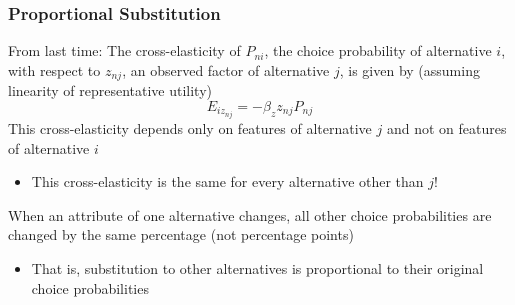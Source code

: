 \documentclass{beamer}
\begin{document}
\begin{frame}\frametitle{Proportional Substitution}
    From last time: The cross-elasticity of $P_{ni}$, the choice probability of alternative $i$, with respect to $z_{nj}$, an observed factor of alternative $j$, is given by (assuming linearity of representative utility)
    $$E_{iz_{nj}} = -\beta_z z_{nj} P_{nj}$$
    This cross-elasticity depends only on features of alternative $j$ and not on features of alternative $i$
    \begin{itemize}
    	\item This cross-elasticity is the same for every alternative other than $j$!
    \end{itemize}
    \vspace{2ex}
    When an attribute of one alternative changes, all other choice probabilities are changed by the same percentage (not percentage points)
    \begin{itemize}
    	\item That is, substitution to other alternatives is proportional to their original choice probabilities
    \end{itemize}
\end{frame}
\end{document}
